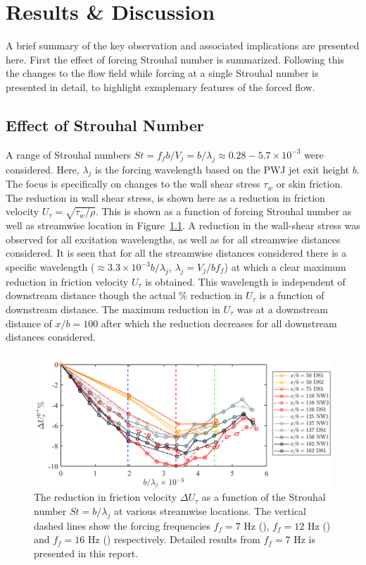 \chapter{ Results \& Discussion}

A brief summary of the key observation and associated implications are presented here. First the effect of forcing Strouhal number is summarized. Following this the changes to the flow field while forcing at a single Strouhal number is presented in detail, to highlight exmplemary features of the forced flow.

\section{Effect of Strouhal Number}

A range of Strouhal numbers $St= f_fb/V_j = b/\lambda_j \approx 0.28 - 5.7 \times 10^{-3}$ were considered. Here, $\lambda_j$ is the forcing wavelength based on the PWJ jet exit height $b$. The focus is specifically on changes to the wall shear stress $\tau_w$ or skin friction. The reduction in wall shear stress, is shown here as a reduction in friction velocity $U_\tau=\sqrt{\tau_w/\rho}$. This is shown as a function of forcing Strouhal number as well as streamwise location in Figure~\ref{fg:uTauStNum}. A reduction in the wall-shear stress was observed for all excitation wavelengths, as well as for all streamwise distances considered. It is seen that for all the streamwise distances considered there is a specific wavelength ($\approx 3.3 \times 10^{-3} b/\lambda_j$, $\lambda_j = V_j/b f_{f}$) at which a clear maximum reduction in friction velocity $U_\tau$ is obtained. This wavelength is independent of downstream distance though the actual \% reduction in $U_\tau$ is a function of downstream distance. The maximum reduction in $U_\tau$ was at a downstream distance of $x/b=100$ after which the reduction decreases for all downstream distances considered. 

\begin{figure}[H]
	\centering
	\includegraphics[width=.99\textwidth]{pics/uTauStNum.png}
	\caption{The reduction in friction velocity $\Delta U_{\tau}$ as a function of the Strouhal number $St = b/\lambda_j$ at various streamwise locations. The vertical dashed lines show the forcing frequencies $f_{f} = 7$ Hz (\textcolor{blue}{\dashed}), $f_{f} = 12$ Hz (\textcolor{red}{\dashed}) and $f_{f} = 16$ Hz (\textcolor{green}{\dashed}) respectively. Detailed results from $f_f=7$ Hz is presented in this report.}
	\label{fg:uTauStNum}
\end{figure}


